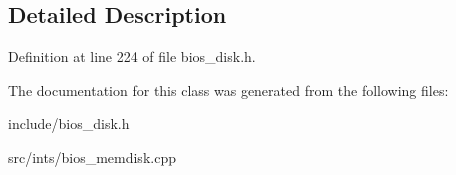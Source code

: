 \subsection{Detailed Description}


Definition at line 224 of file bios\-\_\-disk.\-h.



The documentation for this class was generated from the following files\-:\begin{DoxyCompactItemize}
\item 
include/bios\-\_\-disk.\-h\item 
src/ints/bios\-\_\-memdisk.\-cpp\end{DoxyCompactItemize}
